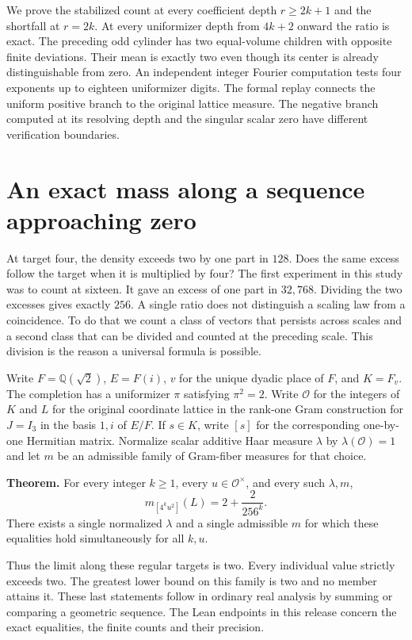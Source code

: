 \documentclass[12pt,letterpaper]{article}
\newcommand{\ruleline}{\par\vspace{1pt}{\color{accent}\rule{\linewidth}{.35pt}}\par}
\begin{document}
\par
We prove the stabilized count at every coefficient depth $r\ge2k+1$ and the shortfall at $r=2k$. At every uniformizer depth from $4k+2$ onward the ratio is exact. The preceding odd cylinder has two equal-volume children with opposite finite deviations. Their mean is exactly two even though its center is already distinguishable from zero. An independent integer Fourier computation tests four exponents up to eighteen uniformizer digits. The formal replay connects the uniform positive branch to the original lattice measure. The negative branch computed at its resolving depth and the singular scalar zero have different verification boundaries.
\clearpage
\makeatletter
\begingroup\small\setlength{\parskip}{0pt}
\renewcommand*{\l@section}[2]{\addvspace{3pt}\@dottedtocline{1}{0em}{1.9em}{#1}{#2}}
\tableofcontents\endgroup
\makeatother
\clearpage{}
\section{An exact mass along a sequence approaching zero}
At target four, the density exceeds two by one part in $128$. Does the same excess follow the target when it is multiplied by four? The first experiment in this study was to count at sixteen. It gave an excess of one part in $32{,}768$. Dividing the two excesses gives exactly $256$. A single ratio does not distinguish a scaling law from a coincidence. To do that we count a class of vectors that persists across scales and a second class that can be divided and counted at the preceding scale. This division is the reason a universal formula is possible.

Write $F=\mathbb Q(\sqrt2)$, $E=F(i)$, $v$ for the unique dyadic place of $F$, and $K=F_v$. The completion has a uniformizer $\pi$ satisfying $\pi^2=2$. Write $\mathcal O$ for the integers of $K$ and $L$ for the original coordinate lattice in the rank-one Gram construction for $J=I_3$ in the basis $1,i$ of $E/F$. If $s\in K$, write $[s]$ for the corresponding one-by-one Hermitian matrix. Normalize scalar additive Haar measure $\lambda$ by $\lambda(\mathcal O)=1$ and let $m$ be an admissible family of Gram-fiber measures for that choice.

\begin{center}\begin{minipage}{.93\linewidth}\ruleline
\textbf{Theorem.} For every integer $k\geq1$, every $u\in\mathcal O^\times$, and every such $\lambda,m$,
\[
       m_{[4^k u^2]}(L)=2+\frac{2}{256^k}.
\]
There exists a single normalized $\lambda$ and a single admissible $m$ for which these equalities hold simultaneously for all $k,u$.
\ruleline\end{minipage}\end{center}
Thus the limit along these regular targets is two. Every individual value strictly exceeds two. The greatest lower bound on this family is two and no member attains it. These last statements follow in ordinary real analysis by summing or comparing a geometric sequence. The Lean endpoints in this release concern the exact equalities, the finite counts and their precision.
\end{document}
